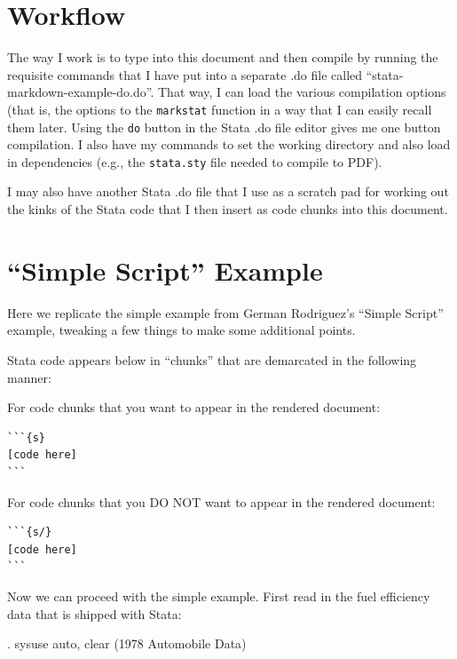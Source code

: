 \documentclass[]{article}
\begin{document}
\hypertarget{workflow}{%
\section{Workflow}\label{workflow}}

The way I work is to type into this document and then compile by running
the requisite commands that I have put into a separate .do file called
``stata-markdown-example-do.do''. That way, I can load the various
compilation options (that is, the options to the \texttt{markstat}
function in a way that I can easily recall them later. Using the
\texttt{do} button in the Stata .do file editor gives me one button
compilation. I also have my commands to set the working directory and
also load in dependencies (e.g., the \texttt{stata.sty} file needed to
compile to PDF).

I may also have another Stata .do file that I use as a scratch pad for
working out the kinks of the Stata code that I then insert as code
chunks into this document.

\hypertarget{simple-script-example}{%
\section{``Simple Script'' Example}\label{simple-script-example}}

Here we replicate the simple example from German Rodriguez's ``Simple
Script'' example, tweaking a few things to make some additional points.

Stata code appears below in ``chunks'' that are demarcated in the
following manner:

For code chunks that you want to appear in the rendered document:

\begin{verbatim}```{s} 
[code here] 
```
\end{verbatim}

For code chunks that you DO NOT want to appear in the rendered document:

\begin{verbatim}```{s/} 
[code here] 
```
\end{verbatim}

Now we can proceed with the simple example. First read in the fuel
efficiency data that is shipped with Stata:

\begin{stlog}
. sysuse auto, clear
(1978 Automobile Data)
\end{stlog}
\end{document}
